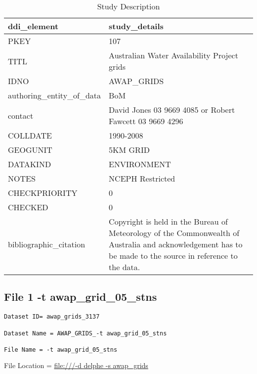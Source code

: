 \documentclass[a4paper]{article}
\begin{document}
\begin{table}[ht]
\begin{center}
\caption{Study Description}
\label{tab:tabx}
\begin{tabular}{p{4cm}p{9cm}}
  \hline
ddi\_element & study\_details \\ 
  \hline
PKEY & 107 \\ 
  TITL & Australian Water Availability Project grids \\ 
  IDNO & AWAP\_GRIDS \\ 
  authoring\_entity\_of\_data & BoM \\ 
  contact & David Jones 03 9669 4085 or Robert Fawcett 03 9669 4296 \\ 
  COLLDATE & 1990-2008 \\ 
  GEOGUNIT & 5KM GRID \\ 
  DATAKIND & ENVIRONMENT \\ 
  NOTES & NCEPH Restricted \\ 
  CHECKPRIORITY & 0 \\ 
  CHECKED & 0 \\ 
  bibliographic\_citation & Copyright is held in the Bureau of Meteorology of the Commonwealth of Australia and acknowledgement has to be made to the source in reference to the data. \\ 
   \hline
\end{tabular}
\end{center}
\end{table}\clearpage
\subsection{File 1 -t awap\_grid\_05\_stns}

\begin{verbatim}
Dataset ID= awap_grids_3137

Dataset Name = AWAP_GRIDS_-t awap_grid_05_stns

File Name = -t awap_grid_05_stns
\end{verbatim}

\noindent File Location = \url{file:///-d delphe -s awap_grids}




 
\end{document}
